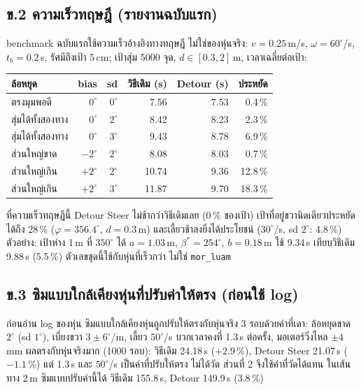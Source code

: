 \documentclass[11pt,a4paper]{article}
\begin{document}
\subsection*{ข.2 ความเร็วทฤษฎี (รายงานฉบับแรก)}
benchmark ฉบับแรกใช้ความเร็วอ้างอิงทางทฤษฎี ไม่ใช่ของหุ่นจริง: $v = 0.25$\,m/s, $\omega = 60^\circ$/s,
$t_b = 0.2$\,s, รัศมีถึงเป้า 5\,cm; เป้าสุ่ม 5000 จุด, $d \in [0.3, 2]$\,m, เวลาเฉลี่ยต่อเป้า:
\begin{center}
\begin{tabular}{lrrrrr}
\toprule
ล้อหยุด & bias & sd & วิธีเดิม (s) & Detour (s) & ประหยัด \\
\midrule
ตรงมุมพอดี         & $0^\circ$  & $0^\circ$ &  7.56 & 7.53 &  0.4\,\% \\
สุ่มได้ทั้งสองทาง    & $0^\circ$  & $2^\circ$ &  8.42 & 8.23 &  2.3\,\% \\
สุ่มได้ทั้งสองทาง    & $0^\circ$  & $3^\circ$ &  9.43 & 8.78 &  6.9\,\% \\
ส่วนใหญ่ขาด        & $-2^\circ$ & $2^\circ$ &  8.08 & 8.03 &  0.7\,\% \\
ส่วนใหญ่เกิน        & $+2^\circ$ & $2^\circ$ & 10.74 & 9.36 & 12.8\,\% \\
ส่วนใหญ่เกิน        & $+2^\circ$ & $3^\circ$ & 11.87 & 9.70 & 18.3\,\% \\
\bottomrule
\end{tabular}
\end{center}
ที่ความเร็วทฤษฎีนี้ Detour Steer ไม่ช้ากว่าวิธีเดิมเลย (0\,\% ของเป้า) เป้าที่อยู่ขวานิดเดียวประหยัดได้ถึง 28\,\%
($\varphi = 356.4^\circ$, $d = 0.3$\,m) และเลี้ยวช้าลงยิ่งได้ประโยชน์ ($30^\circ$/s, sd $2^\circ$: 4.8\,\%)
ตัวอย่าง: เป้าห่าง 1\,m ที่ $350^\circ$ ได้ $a = 1.03$\,m, $\beta^\ast = 254^\circ$, $b = 0.18$\,m ใช้ 9.34\,s
เทียบวิธีเดิม 9.88\,s (5.5\,\%) ตัวเลขชุดนี้ใช้กับหุ่นที่เร็วกว่า ไม่ใช่ \texttt{mor\_luam}

\subsection*{ข.3 ซิมแบบใกล้เคียงหุ่นที่ปรับค่าให้ตรง (ก่อนใช้ log)}
ก่อนอ่าน log ของหุ่น ซิมแบบใกล้เคียงหุ่นถูกปรับให้ตรงกับหุ่นจริง 3 รอบด้วยค่าที่เดา: ล้อหยุดขาด $2^\circ$
(sd $1^\circ$), เบี่ยงขวา $3 \pm 6^\circ$/m, เลี้ยว $50^\circ$/s บวกเวลาคงที่ 1.3\,s ต่อครั้ง, มอเตอร์วิ่งไหล $\pm 4$\,mm
ผลตรงกับหุ่นจริงมาก (1000 รอบ): วิธีเดิม 24.18\,s ($+2.9\,\%$), Detour Steer 21.07\,s ($-1.1\,\%$)
แต่ 1.3\,s และ $50^\circ$/s เป็นค่าที่ปรับให้ตรง ไม่ได้วัด ส่วนที่ 2 จึงใช้ค่าที่วัดได้แทน
ในเส้นทาง 2\,m ซิมแบบปรับค่านี้ได้ วิธีเดิม 155.8\,s, Detour 149.9\,s (3.8\,\%)
\end{document}
